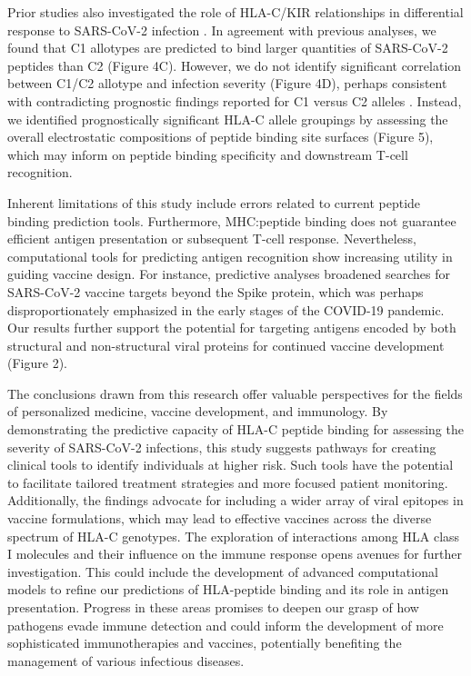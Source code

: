 \documentclass[utf8]{frontiersinFPHY_FAMS} %
\begin{document}
Prior studies also investigated the role of HLA-C/KIR relationships in differential response to SARS-CoV-2 infection \citep{34352002, 35874712, 33233780}. In agreement with previous analyses, we found that C1 allotypes are predicted to bind larger quantities of SARS-CoV-2 peptides than C2 \citep{32810602} (Figure 4C).  However, we do not identify significant correlation between C1/C2 allotype and infection severity (Figure 4D), perhaps consistent with contradicting prognostic findings reported for C1 versus C2 alleles \citep{32988645, 32717807, 32717807, 35960731, 34490415, 33343579, 34289534, 34722002, 33298875, 32988645, 35960731, 35681490, 33905752}.  Instead, we identified prognostically significant HLA-C allele groupings by assessing the overall electrostatic compositions of peptide binding site surfaces (Figure 5), which may inform on peptide binding specificity and downstream T-cell recognition. 

Inherent limitations of this study include errors related to current peptide binding prediction tools. Furthermore, MHC:peptide binding does not guarantee efficient antigen presentation or subsequent T-cell response. Nevertheless, computational tools for predicting antigen recognition show increasing utility in guiding vaccine design. For instance, predictive analyses broadened searches for SARS-CoV-2 vaccine targets beyond the Spike protein, which was perhaps disproportionately emphasized in the early stages of the COVID-19 pandemic. Our results further support the potential for targeting antigens encoded by both structural and non-structural viral proteins for continued vaccine development (Figure 2).

The conclusions drawn from this research offer valuable perspectives for the fields of personalized medicine, vaccine development, and immunology. By demonstrating the predictive capacity of HLA-C peptide binding for assessing the severity of SARS-CoV-2 infections, this study suggests pathways for creating clinical tools to identify individuals at higher risk. Such tools have the potential to facilitate tailored treatment strategies and more focused patient monitoring. Additionally, the findings advocate for including a wider array of viral epitopes in vaccine formulations, which may lead to effective vaccines across the diverse spectrum of HLA-C genotypes. The exploration of interactions among HLA class I molecules and their influence on the immune response opens avenues for further investigation. This could include the development of advanced computational models to refine our predictions of HLA-peptide binding and its role in antigen presentation. Progress in these areas promises to deepen our grasp of how pathogens evade immune detection and could inform the development of more sophisticated immunotherapies and vaccines, potentially benefiting the management of various infectious diseases. 
\end{document}
